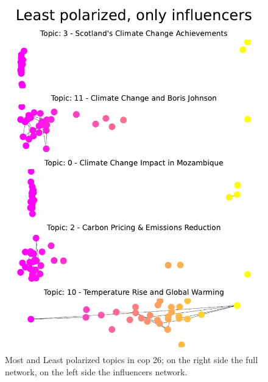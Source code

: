 \begin{figure}[H]
\begin{minipage}{0.50\textwidth}
    \end{minipage}\hfill
    \begin{minipage}{0.50\textwidth}
        \centering
         \includegraphics[width=0.98\linewidth]{Chapter5/figures/Least polarized, only influencers.pdf}
        
    \end{minipage}

    \caption{Most and Least polarized topics in cop 26; on the right side the full network, on the left side the influencers network.}
    \label{fig:networks_polarization}
\end{figure}


